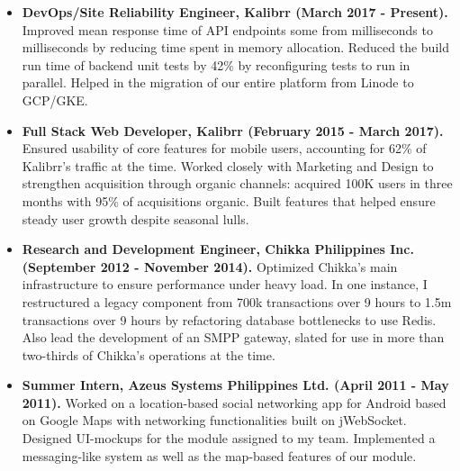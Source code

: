 \documentclass{article}
\begin{document}
    \begin{itemize}
      \item \textbf{DevOps/Site Reliability Engineer, Kalibrr (March 2017 - Present).}
      Improved mean response time of API endpoints some from 
      milliseconds to  milliseconds by reducing time spent in memory
      allocation. Reduced the build run time of backend unit tests by 42\% by
      reconfiguring tests to run in parallel. Helped in the migration of our 
      entire platform from Linode to GCP/GKE.
      

      \item \textbf{Full Stack Web Developer, Kalibrr (February 2015 - March 2017).}
      Ensured usability of core features for mobile users, accounting for 62\% of Kalibrr's traffic
      at the time. Worked closely with Marketing and Design to strengthen acquisition
      through organic channels: acquired \ctilde100K users in three months with 95\% of
      acquisitions organic. Built features that helped ensure steady user growth despite seasonal lulls.

      
      \item \textbf{Research and Development Engineer, Chikka Philippines Inc. (September 2012 - November 2014).}
      Optimized Chikka's main infrastructure to ensure performance under heavy
      load. In one instance, I restructured a legacy component from \ctilde700k
      transactions over 9 hours to \ctilde1.5m transactions over 9 hours by
      refactoring database bottlenecks to use Redis. Also lead the development
      of an SMPP gateway, slated for use in more than two-thirds of Chikka's
      operations at the time.


      \item \textbf{Summer Intern, Azeus Systems Philippines Ltd. (April 2011 - May 2011).} Worked on a
      location-based social networking app for Android based on Google Maps with networking functionalities built
      on jWebSocket. Designed UI-mockups for the module assigned to my team. Implemented a
      messaging-like system as well as the map-based features of our module.

   \end{itemize}
\end{document}
